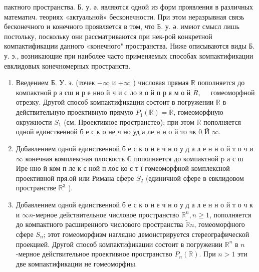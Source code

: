 \documentclass[10pt]{article}
\begin{document}
пактного пространства. Б. у. ә. являются одной из форм проявления в различных математич. теориях «актуальной» бесконечности. При этом неразрывная связь бесконечного и конечного проявляется в том, что Б. у. ә. имеют смысл лишь постольку, поскольку они рассматриваются при нек-рой конкретной компактификации данного «конечного" пространства. Ниже описываются виды Б. у. э., возникающие при наиболее часто применяемых способах компактификации евклидовых конечномерных пространств.



\begin{enumerate}

  \item Введением Б. У. э. (точек $-\infty$ и $+\infty$ ) числовая прямая $\mathbb{R}$ пополняется до компактной р а сш и р е нно й ч и с ло в о й п р я м о й $\bar{R}, \quad$ гомеоморфной отрезку. Другой способ компактификации состоит в погружении $\mathbb{R}$ в действительную проективную прямую $P_{1}(\mathbb{R})=\tilde{\mathbb{R}}$, гомеоморфную окружности $S_{1}$ (см. Проективное пространстео); при этом $\mathbb{R}$ пополняется одной единственной б е с к о не ч но уд а ле н н о й то чк 0 Й $\infty$.



  \item Добавлением одной единственной б е с к о н е ч н о у д а л е н н о й т о ч и $\infty$ конечная комплексная плоскость $\mathbb{C}$ пополняется до компактной $\mathrm{p}$ а с ш Ире нно й ком п ле к с ной п лос ко с т ї гомеоморфной комплексной проективной пря.ой или Римана сфере $S_{2}$ (единичной сфере в евклидовом пространстве $\mathbb{R}^{3}$ ).



  \item Добавлением одной единственной б е с к о н е ч н о у д а л е н н о й т о ч к и $\infty n$-мерное действительное числовое пространство $\mathbb{R}^{n}, n \geqslant 1$, пополняется до компактного расширенного числового пространства $\widetilde{\mathbb{R}} n$, гомеоморфного сфере $S_{n}$; этот гомеоморфизм наглядно демонстрируется стереографической проекцией. Другой способ компактификации состоит в погружении $\mathbb{R}^{n}$ в $n$-мерное действительное проективное пространство $P_{n}(\mathbb{R})$. При $n>1$ эти две компактификации не гомеоморфны.



\end{enumerate}
\end{document}
